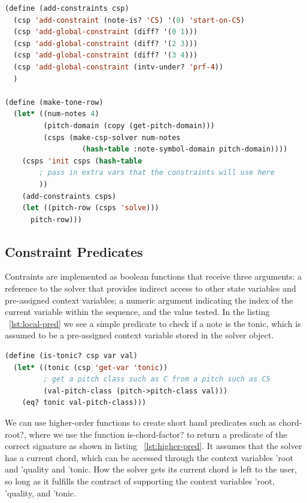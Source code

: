 \documentclass[pmlr]{jmlr}%
\begin{document}
\begin{lstlisting}[float = t, language=Lisp,label=lst:use,caption=Using the solver]
(define (add-constraints csp)
  (csp 'add-constraint (note-is? 'C5) '(0) 'start-on-C5)
  (csp 'add-global-constraint (diff? '(0 1)))
  (csp 'add-global-constraint (diff? '(2 3)))
  (csp 'add-global-constraint (diff? '(3 4)))
  (csp 'add-global-constraint (intv-under? 'prf-4))
  )

(define (make-tone-row)
  (let* ((num-notes 4)
         (pitch-domain (copy (get-pitch-domain)))
         (csps (make-csp-solver num-notes
                  (hash-table :note-symbol-domain pitch-domain))))
    (csps 'init csps (hash-table
        ; pass in extra vars that the constraints will use here
        ))
    (add-constraints csps)
    (let ((pitch-row (csps 'solve)))
      pitch-row)))
\end{lstlisting}

\subsection{Constraint Predicates}
Contraints are implemented as boolean functions that receive three arguments:
a reference to the solver that provides indirect access to other state variables
and pre-assigned context variables; a numeric argument indicating the index
of the current variable within the sequence, and the value tested.
In the listing ~\ref{lst:local-pred} we see a simple predicate to check if a note 
is the tonic, which is assumed to be a pre-assigned context variable
stored in the solver object.

\begin{lstlisting}[language=Lisp,label=lst:local-pred,caption=A simple local constraint]
(define (is-tonic? csp var val)
  (let* ((tonic (csp 'get-var 'tonic))
         ; get a pitch class such as C from a pitch such as C5
         (val-pitch-class (pitch->pitch-class val)))
    (eq? tonic val-pitch-class)))
\end{lstlisting}

We can use higher-order functions to create short hand predicates such as chord-root?, 
where we use the function is-chord-factor? to return a predicate of the correct 
signature as shown in listing ~\ref{lst:higher-pred}. It assumes that the solver has a current chord, which can be accessed
through the context variables 'root and 'quality and 'tonic.
How the solver gets its current chord is left to the user, so long as it
fulfills the contract of supporting the context variables 'root, 'quality, and 'tonic.
\end{document}
